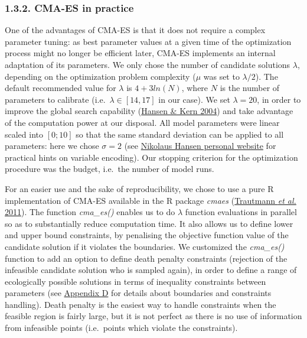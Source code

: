 \documentclass[11pt,]{article}
\begin{document}
\hypertarget{cma-es-in-practice}{%
\subsubsection{1.3.2. CMA-ES in practice}\label{cma-es-in-practice}}

One of the advantages of CMA-ES is that it does not require a complex
parameter tuning: as best parameter values at a given time of the
optimization process might no longer be efficient later, CMA-ES
implements an internal adaptation of its parameters. We only chose the
number of candidate solutions \(\lambda\), depending on the optimization
problem complexity (\(\mu\) was set to \(\lambda/2\)). The default
recommended value for \(\lambda\) is \(4 + 3 ln(N)\), where \(N\) is the
number of parameters to calibrate (i.e.~\(\lambda \in [14,17]\) in our
case). We set \(\lambda = 20\), in order to improve the global search
capability (\protect\hyperlink{ref-Hansen2004}{Hansen \& Kern 2004}) and
take advantage of the computation power at our disposal. All model
parameters were linear scaled into \([0;10]\) so that the same standard
deviation can be applied to all parameters: here we chose \(\sigma = 2\)
(see
\href{https://cma-es.github.io/cmaes_sourcecode_page.html\#practical}{Nikolaus
Hansen personal website} for practical hints on variable encoding). Our
stopping criterion for the optimization procedure was the budget,
i.e.~the number of model runs.

For an easier use and the sake of reproducibility, we chose to use a
pure R implementation of CMA-ES available in the R package \emph{cmaes}
(\protect\hyperlink{ref-Trautmann2011}{Trautmann \emph{et al.} 2011}).
The function \emph{cma\_es()} enables us to do \(\lambda\) function
evaluations in parallel so as to substantially reduce computation time.
It also allows us to define lower and upper bound constraints, by
penalising the objective function value of the candidate solution if it
violates the boundaries. We customized the \emph{cma\_es()} function to
add an option to define death penalty constraints (rejection of the
infeasible candidate solution who is sampled again), in order to define
a range of ecologically possible solutions in terms of inequality
constraints between parameters (see
\protect\hyperlink{appendixD}{Appendix D} for details about boundaries
and constraints handling). Death penalty is the easiest way to handle
constraints when the feasible region is fairly large, but it is not
perfect as there is no use of information from infeasible points
(i.e.~points which violate the constraints).
\end{document}
